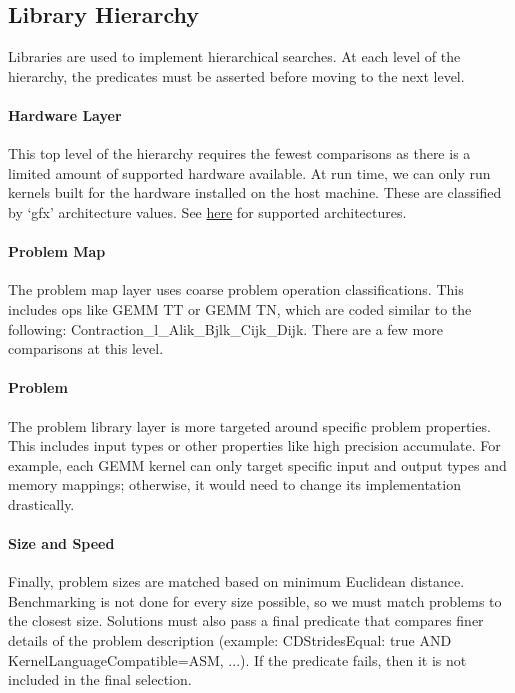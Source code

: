 \documentclass[]{article}
\begin{document}
\subsection{Library Hierarchy}

Libraries are used to implement hierarchical searches. At each level of the hierarchy, the predicates must be asserted before moving to the next level.

\paragraph{Hardware Layer}

This top level of the hierarchy requires the fewest comparisons as there is a limited amount of supported hardware available. At run time, we can only run kernels built for the hardware installed on the host machine. These are classified by `gfx' architecture values. See \href{https://github.com/ROCmSoftwarePlatform/Tensile/wiki/Languages}{here} for supported architectures.

\paragraph{Problem Map}
The problem map layer uses coarse problem operation classifications. This includes ops like GEMM TT or GEMM TN, which are coded similar to the following: Contraction\_l\_Alik\_Bjlk\_Cijk\_Dijk. There are a few more comparisons at this level.

\paragraph{Problem}

The problem library layer is more targeted around specific problem properties. This includes input types or other properties like high precision accumulate. For example, each GEMM kernel can only target specific input and output types and memory mappings; otherwise, it would need to change its implementation drastically.

\paragraph{Size and Speed}

Finally, problem sizes are matched based on minimum Euclidean distance. Benchmarking is not done for every size possible, so we must match problems to the closest size. Solutions must also pass a final predicate that compares finer details of the problem description (example: CDStridesEqual: true AND KernelLanguageCompatible=ASM, ...). If the predicate fails, then it is not included in the final selection.
\end{document}
